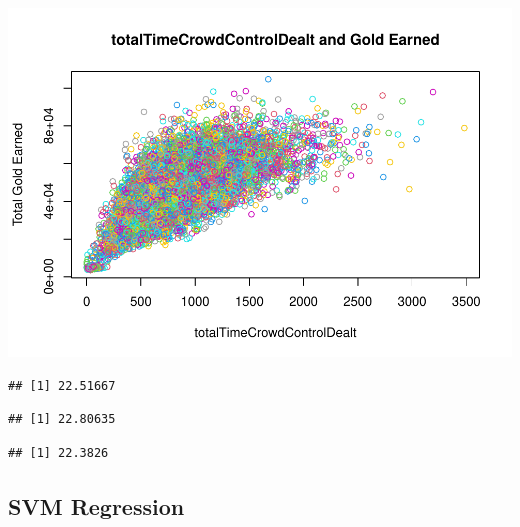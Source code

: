 \documentclass[
]{article}
\newenvironment{Shaded}{\begin{snugshade}}{\end{snugshade}}
\newcommand{\FunctionTok}[1]{\textcolor[rgb]{0.00,0.00,0.00}{#1}}
\newcommand{\NormalTok}[1]{#1}
\newcommand{\SpecialCharTok}[1]{\textcolor[rgb]{0.00,0.00,0.00}{#1}}
\begin{document}
\includegraphics{Regression_files/figure-latex/unnamed-chunk-5-9.pdf}

\begin{Shaded}
\end{Shaded}

\begin{verbatim}
## [1] 22.51667
\end{verbatim}

\begin{Shaded}
\end{Shaded}

\begin{verbatim}
## [1] 22.80635
\end{verbatim}

\begin{Shaded}
\end{Shaded}

\begin{verbatim}
## [1] 22.3826
\end{verbatim}

\hypertarget{svm-regression}{%
\subsection{SVM Regression}\label{svm-regression}}
\end{document}
